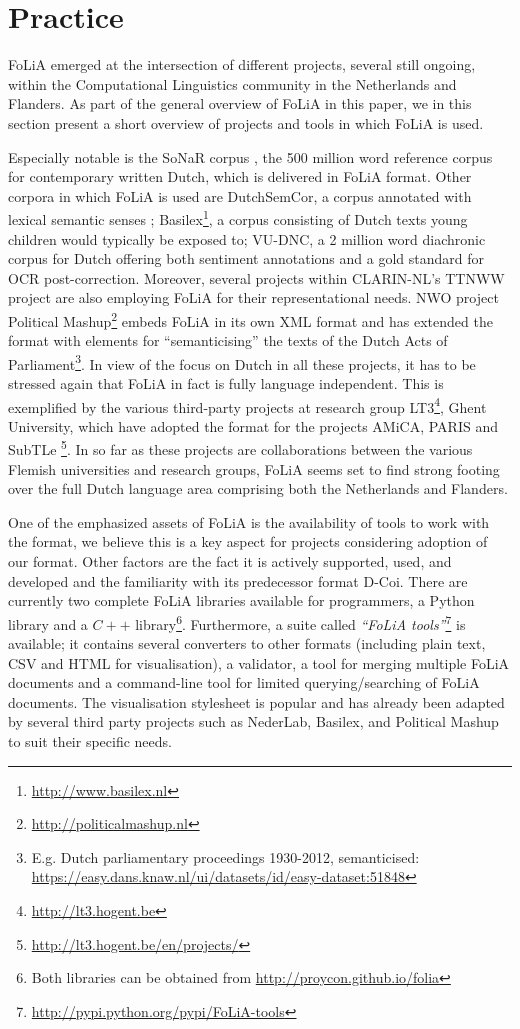 \documentclass[a4paper,10pt,twoside]{article}
\begin{document}
\section{Practice}
\label{sec:practice}

FoLiA emerged at the intersection of different projects, several still ongoing, within the Computational
Linguistics community in the Netherlands and Flanders. As part of the general overview of FoLiA in this paper, we in
this section present a short overview of projects and tools in which FoLiA is
used.
 
Especially notable is the SoNaR corpus \cite{StevinSONAR2013}, the 500 million
word reference corpus for contemporary written Dutch, which is delivered in
FoLiA format. Other corpora in which FoLiA is used are DutchSemCor, a corpus
annotated with lexical semantic senses \cite{DUTCHSEMCOR};
Basilex\footnote{\url{http://www.basilex.nl}}, a corpus consisting of
Dutch texts young children would typically be exposed to; VU-DNC, a 2 million word diachronic corpus for Dutch offering both sentiment annotations and a gold standard for OCR post-correction.
Moreover, several projects within CLARIN-NL's TTNWW project are also employing FoLiA for
their representational needs. NWO project Political Mashup\footnote{\url{http://politicalmashup.nl}} embeds FoLiA in its own XML
format and has extended the format with elements for ``semanticising'' the
texts of the Dutch Acts of Parliament\footnote{E.g. Dutch parliamentary
proceedings 1930-2012, semanticised:
\url{https://easy.dans.knaw.nl/ui/datasets/id/easy-dataset:51848}}. In view of
the focus on Dutch in all these projects, it has to be stressed again that
FoLiA in fact is fully language independent. This is exemplified by the various
third-party projects at research group LT3\footnote{\url{http://lt3.hogent.be}}, Ghent
University, which have adopted the format for the projects AMiCA, PARIS and SubTLe \footnote{\url{http://lt3.hogent.be/en/projects/}}. In so far as these projects are collaborations between the various Flemish universities and research groups, FoLiA seems set to find strong footing over the full Dutch language area comprising both the Netherlands and Flanders.

One of the emphasized assets of FoLiA is the availability of tools to work with
the format, we believe this is a key aspect for projects considering adoption
of our format. Other factors are the fact it is actively supported, used, and
developed and the familiarity with its predecessor format D-Coi. There are
currently two complete FoLiA libraries available for programmers, a Python library
and a $C++$ library\footnote{Both libraries can be obtained from
\url{http://proycon.github.io/folia}}. Furthermore, a suite called
\emph{``FoLiA tools''}\footnote{\url{http://pypi.python.org/pypi/FoLiA-tools}}
is available; it contains several converters to other formats (including plain
text, CSV and HTML for visualisation), a validator, a tool for merging multiple
FoLiA documents and a command-line tool for limited querying/searching of FoLiA
documents. The visualisation stylesheet is popular and has already been adapted
by several third party projects such as NederLab, Basilex, and Political Mashup
to suit their specific needs.
\end{document}
